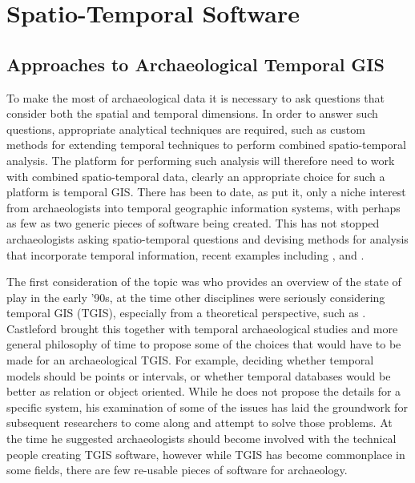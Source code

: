 \chapter{Spatio-Temporal Software}  %
\label{ch:tgis}
\section{Approaches to Archaeological Temporal GIS}
To make the most of archaeological data it is necessary to ask questions that consider both the spatial and temporal dimensions. In order to answer such questions, appropriate analytical techniques are required, such as custom methods for extending temporal techniques to perform combined spatio-temporal analysis. The platform for performing such analysis will therefore need to work with combined spatio-temporal data, clearly an appropriate choice for such a platform is temporal GIS. There has been to date, as \citet{Green:2008fk} put it, only a niche interest from archaeologists into temporal geographic information systems, with perhaps as few as two generic pieces of software being created. This has not stopped archaeologists asking spatio-temporal questions and devising methods for analysis that incorporate temporal information, recent examples including \citet{Frachetti:2006fk}, \citet{Palmer:2006uq} and \citet{Whittle:2008fk}.

The first consideration of the topic was \citet{Castleford:1992fk} who provides an overview of the state of play in the early '90s, at the time other disciplines were seriously considering temporal GIS (TGIS), especially from a theoretical perspective, such as \citet{Langran:1992uq}. Castleford brought this together with temporal archaeological studies and more general philosophy of time to propose some of the choices that would have to be made for an archaeological TGIS. For example, deciding whether temporal models should be points or intervals, or whether temporal databases would be better as relation or object oriented. While he does not propose the details for a specific system, his examination of some of the issues has laid the groundwork for subsequent researchers to come along and attempt to solve those problems. At the time he suggested archaeologists should become involved with the technical people creating TGIS software, however while TGIS has become commonplace in some fields, there are few re-usable pieces of software for archaeology. 

